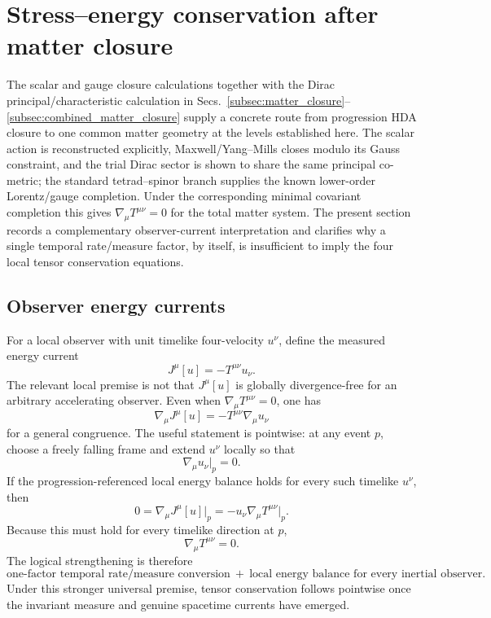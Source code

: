 \documentclass[11pt]{article}
\begin{document}
\section{Stress--energy conservation after matter closure}

The scalar and gauge closure calculations together with the Dirac principal/characteristic calculation in Secs.~\ref{subsec:matter_closure}--\ref{subsec:combined_matter_closure} supply a concrete route from progression HDA closure to one common matter geometry at the levels established here. The scalar action is reconstructed explicitly, Maxwell/Yang--Mills closes modulo its Gauss constraint, and the trial Dirac sector is shown to share the same principal co-metric; the standard tetrad--spinor branch supplies the known lower-order Lorentz/gauge completion. Under the corresponding minimal covariant completion this gives $\nabla_\mu T^{\mu\nu}=0$ for the total matter system. The present section records a complementary observer-current interpretation and clarifies why a single temporal rate/measure factor, by itself, is insufficient to imply the four local tensor conservation equations.

\subsection{Observer energy currents}

For a local observer with unit timelike four-velocity $u^\nu$, define the measured energy current
\begin{equation}
    \boxed{J^\mu[u]=-T^{\mu\nu}u_\nu.}
    \label{eq:observer_current}
\end{equation}
The relevant local premise is not that $J^\mu[u]$ is globally divergence-free for an arbitrary accelerating observer. Even when $\nabla_\mu T^{\mu\nu}=0$, one has
\begin{equation}
    \nabla_\mu J^\mu[u]
    =-T^{\mu\nu}\nabla_\mu u_\nu
\end{equation}
for a general congruence. The useful statement is pointwise: at any event $p$, choose a freely falling frame and extend $u^\nu$ locally so that
\begin{equation}
    \nabla_\mu u_\nu\big|_p=0.
\end{equation}
If the progression-referenced local energy balance holds for every such timelike $u^\nu$, then
\begin{equation}
    0=\nabla_\mu J^\mu[u]\big|_p
    =-u_\nu\nabla_\mu T^{\mu\nu}\big|_p.
\end{equation}
Because this must hold for every timelike direction at $p$,
\begin{equation}
    \boxed{\nabla_\mu T^{\mu\nu}=0.}
    \label{eq:T_conservation}
\end{equation}
The logical strengthening is therefore
\begin{equation}
    \boxed{
    \text{one-factor temporal rate/measure conversion}
    \ +\ 
    \text{local energy balance for every inertial observer}.}
    \label{eq:strengthening}
\end{equation}
Under this stronger universal premise, tensor conservation follows pointwise once the invariant measure and genuine spacetime currents have emerged.
\end{document}
